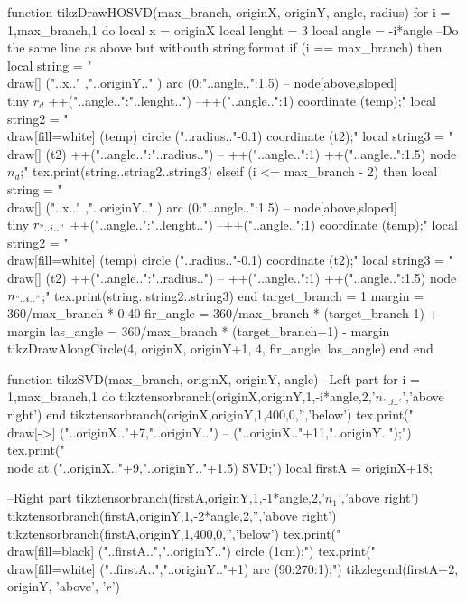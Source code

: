 \begin{luacode*}
function tikzDrawHOSVD(max_branch, originX, originY, angle, radius)
	 for i = 1,max_branch,1 do
      local x = originX
      local lenght = 3
      local angle = -i*angle
      --Do the same line as above but withouth string.format
      if (i == max_branch) then
				 local string = "\\draw[] ("..x.." ,"..originY.." ) arc (0:"..angle..":1.5) -- node[above,sloped] {\\tiny $r_{d}$} ++("..angle..":"..lenght..") --++("..angle..":1) coordinate (temp);"
				 local string2 = "\\draw[fill=white] (temp) circle ("..radius.."-0.1) coordinate (t2);"
				 local string3 = "\\draw[] (t2) ++("..angle..":"..radius..") -- ++("..angle..":1) ++("..angle..":1.5) node {$n_{d}$};"
				 tex.print(string..string2..string3)
      elseif (i <= max_branch - 2) then
				 local string = "\\draw[] ("..x.." ,"..originY.." ) arc (0:"..angle..":1.5) -- node[above,sloped] {\\tiny $r_{"..i.."}$} ++("..angle..":"..lenght..")  --++("..angle..":1) coordinate (temp);"
				 local string2 = "\\draw[fill=white] (temp) circle ("..radius.."-0.1) coordinate (t2);"
				 local string3 = "\\draw[] (t2) ++("..angle..":"..radius..") -- ++("..angle..":1) ++("..angle..":1.5) node {$n_{"..i.."}$};"
				 tex.print(string..string2..string3)
      end
      target_branch = 1
      margin = 360/max_branch * 0.40
      fir_angle = 360/max_branch * (target_branch-1) + margin
      las_angle = 360/max_branch * (target_branch+1) - margin
      tikzDrawAlongCircle(4, originX, originY+1, 4, fir_angle, las_angle)
	 end
end

function tikzSVD(max_branch, originX, originY, angle)
	 --Left part
	 for i = 1,max_branch,1 do
			tikztensorbranch(originX,originY,1,-i*angle,2,'$n_{'..i..'}$','above right')
	 end
	 tikztensorbranch(originX,originY,1,400,0,'','below')
	 tex.print("\\draw[->] ("..originX.."+7,"..originY..") -- ("..originX.."+11,"..originY..");")
	 tex.print("\\node at ("..originX.."+9,"..originY.."+1.5) {SVD};")
	 local firstA = originX+18;
	 
	 --Right part
	 tikztensorbranch(firstA,originY,1,-1*angle,2,'$n_{1}$','above right')
	 tikztensorbranch(firstA,originY,1,-2*angle,2,'','above right')
	 tikztensorbranch(firstA,originY,1,400,0,'','below')
	 tex.print("\\draw[fill=black] ("..firstA..","..originY..") circle (1cm);")
	 tex.print("\\draw[fill=white] ("..firstA..","..originY.."+1) arc (90:270:1);")
	 tikzlegend(firstA+2, originY, 'above', '$r$')


\end{luacode*}
